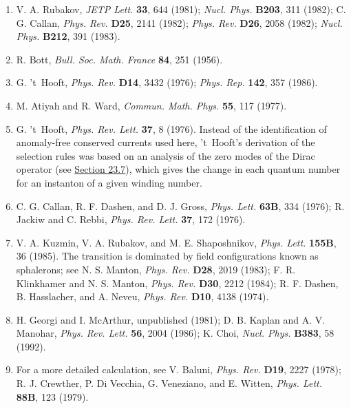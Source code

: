 \begin{enumerate}
\item {}\label{ch23-ref-21}
V. A. Rubakov, \emph{JETP Lett.} \textbf{33}, 644 (1981);
\emph{Nucl. Phys.} \textbf{B203}, 311 (1982); C. G. Callan,
\emph{Phys. Rev.} \textbf{D25}, 2141 (1982); \emph{Phys. Rev.}
\textbf{D26}, 2058 (1982); \emph{Nucl. Phys.} \textbf{B212}, 391
(1983).

\item {}\label{ch23-ref-22}
R. Bott, \emph{Bull. Soc. Math. France} \textbf{84}, 251 (1956).

\item {}\label{ch23-ref-23}
G. 't~Hooft, \emph{Phys. Rev.} \textbf{D14}, 3432 (1976);
\emph{Phys. Rep.} \textbf{142}, 357 (1986).

\item {}\label{ch23-ref-24}
M. Atiyah and R. Ward, \emph{Commun. Math. Phys.} \textbf{55}, 117
(1977).

\item {}\label{ch23-ref-25}
G. 't~Hooft, \emph{Phys. Rev. Lett.} \textbf{37}, 8 (1976). Instead
of the identification of anomaly-free conserved currents used here,
't~Hooft's derivation of the selection rules was based on an analysis of
the zero modes of the Dirac operator (see
\hyperref[sec:23.7]{Section 23.7}), which gives the change in each quantum
number for an instanton of a given winding number.

\item {}\label{ch23-ref-26}
C. G. Callan, R. F. Dashen, and D. J. Gross, \emph{Phys. Lett.}
\textbf{63B}, 334 (1976); R. Jackiw and C. Rebbi,
\emph{Phys. Rev. Lett.} \textbf{37}, 172 (1976).

\item {}\label{ch23-ref-27}
V. A. Kuzmin, V. A. Rubakov, and M. E. Shaposhnikov,
\emph{Phys. Lett.} \textbf{155B}, 36 (1985). The transition is dominated
by field configurations known as sphalerons; see N. S. Manton,
\emph{Phys. Rev.} \textbf{D28}, 2019 (1983); F. R. Klinkhamer and
N. S. Manton, \emph{Phys. Rev.} \textbf{D30}, 2212 (1984);
R. F. Dashen, B. Hasslacher, and A. Neveu, \emph{Phys. Rev.}
\textbf{D10}, 4138 (1974).

\item {}\label{ch23-ref-28}
H. Georgi and I. McArthur, unpublished (1981); D. B. Kaplan and
A. V. Manohar, \emph{Phys. Rev. Lett.} \textbf{56}, 2004 (1986);
K. Choi, \emph{Nucl. Phys.} \textbf{B383}, 58 (1992).

\item {}\label{ch23-ref-29}
For a more detailed calculation, see V. Baluni, \emph{Phys. Rev.}
\textbf{D19}, 2227 (1978); R. J. Crewther, P. Di Vecchia,
G. Veneziano, and E. Witten, \emph{Phys. Lett.} \textbf{88B}, 123
(1979).


\end{enumerate}
